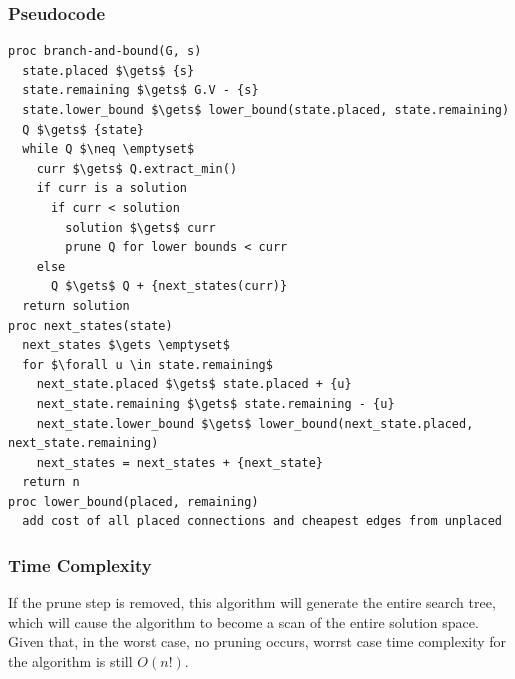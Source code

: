 \documentclass[a4paper,12pt]{article}
\begin{document}
\subsubsection{Pseudocode}
\begin{lstlisting}[mathescape=true]
proc branch-and-bound(G, s)
  state.placed $\gets$ {s}
  state.remaining $\gets$ G.V - {s}
  state.lower_bound $\gets$ lower_bound(state.placed, state.remaining)
  Q $\gets$ {state}
  while Q $\neq \emptyset$
    curr $\gets$ Q.extract_min()
    if curr is a solution
      if curr < solution
        solution $\gets$ curr
        prune Q for lower bounds < curr
    else
      Q $\gets$ Q + {next_states(curr)}
  return solution
proc next_states(state)
  next_states $\gets \emptyset$
  for $\forall u \in state.remaining$
    next_state.placed $\gets$ state.placed + {u}
    next_state.remaining $\gets$ state.remaining - {u}
    next_state.lower_bound $\gets$ lower_bound(next_state.placed, next_state.remaining)
    next_states = next_states + {next_state}
  return n
proc lower_bound(placed, remaining)
  add cost of all placed connections and cheapest edges from unplaced
\end{lstlisting}
\subsubsection{Time Complexity}
If the prune step is removed, this algorithm will generate the entire search tree, which will cause the algorithm to become a scan of the entire solution space. Given that, in the worst case, no pruning occurs, worrst case time complexity for the algorithm is still $O(n!)$.
\end{document}
